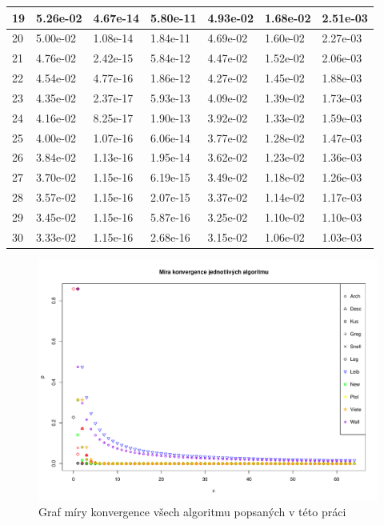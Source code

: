 \documentclass[rocnikovka]{gzwroc} %
\begin{document}
\begin{table}[h!]
\begin{tabular}{|l|l|l|l|l|l|l|}
19 & 5.26e-02 & 4.67e-14 & 5.80e-11 & 4.93e-02 & 1.68e-02 & 2.51e-03 \\ \hline 
20 & 5.00e-02 & 1.08e-14 & 1.84e-11 & 4.69e-02 & 1.60e-02 & 2.27e-03 \\ \hline 
21 & 4.76e-02 & 2.42e-15 & 5.84e-12 & 4.47e-02 & 1.52e-02 & 2.06e-03 \\ \hline 
22 & 4.54e-02 & 4.77e-16 & 1.86e-12 & 4.27e-02 & 1.45e-02 & 1.88e-03 \\ \hline 
23 & 4.35e-02 & 2.37e-17 & 5.93e-13 & 4.09e-02 & 1.39e-02 & 1.73e-03 \\ \hline 
24 & 4.16e-02 & 8.25e-17 & 1.90e-13 & 3.92e-02 & 1.33e-02 & 1.59e-03 \\ \hline 
25 & 4.00e-02 & 1.07e-16 & 6.06e-14 & 3.77e-02 & 1.28e-02 & 1.47e-03 \\ \hline 
26 & 3.84e-02 & 1.13e-16 & 1.95e-14 & 3.62e-02 & 1.23e-02 & 1.36e-03 \\ \hline 
27 & 3.70e-02 & 1.15e-16 & 6.19e-15 & 3.49e-02 & 1.18e-02 & 1.26e-03 \\ \hline 
28 & 3.57e-02 & 1.15e-16 & 2.07e-15 & 3.37e-02 & 1.14e-02 & 1.17e-03 \\ \hline 
29 & 3.45e-02 & 1.15e-16 & 5.87e-16 & 3.25e-02 & 1.10e-02 & 1.10e-03 \\ \hline 
30 & 3.33e-02 & 1.15e-16 & 2.68e-16 & 3.15e-02 & 1.06e-02 & 1.03e-03 \\ \hline 
\end{tabular}
\end{table}

\begin{figure}[!ht]
\includegraphics[width=16cm]{Graf1}
\caption{Graf míry konvergence všech algoritmu popsaných v této práci}
\label{fig:graf1}
\end{figure}
\end{document}
